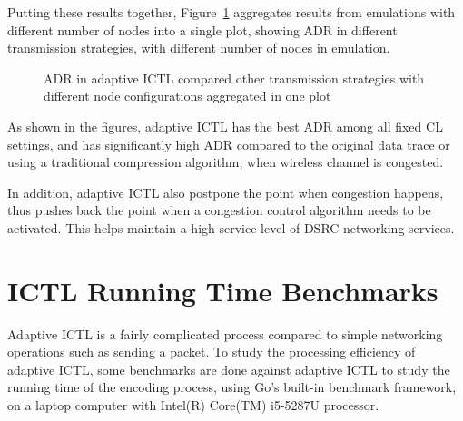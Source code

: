 \documentclass[12pt]{report}
\begin{document}
Putting these results together, Figure~\ref{fig:adaptive_adr_aggr} aggregates results from emulations with different number of nodes into a single plot, showing ADR in different transmission strategies, with different number of nodes in emulation.

\begin{figure}[H]
  \caption{\label{fig:adaptive_adr_aggr}ADR in adaptive ICTL compared other transmission strategies with different node configurations aggregated in one plot}
\end{figure}

As shown in the figures, adaptive ICTL has the best ADR among all fixed CL settings, and has significantly high ADR compared to the original data trace or using a traditional compression algorithm, when wireless channel is congested.

In addition, adaptive ICTL also postpone the point when congestion happens, thus pushes back the point when a congestion control algorithm needs to be activated. This helps maintain a high service level of DSRC networking services.

\section{ICTL Running Time Benchmarks}

Adaptive ICTL is a fairly complicated process compared to simple networking operations such as sending a packet. To study the processing efficiency of adaptive ICTL, some benchmarks are done against adaptive ICTL to study the running time of the encoding process, using Go's built-in benchmark framework, on a laptop computer with Intel(R) Core(TM) i5-5287U processor.
\end{document}
